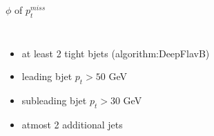 \documentclass[10pt,xcolor=dvipsnames]{beamer}
\begin{document}
\begin{frame}[fragile]{$\phi $ of $p^{miss}_t$ }
\begin{columns}
\begin{itemize}
      \item {at least 2 tight bjets (algorithm:DeepFlavB)}
      \item {leading bjet $p_t > 50 $ GeV}
      \item {subleading bjet $p_t > 30 $ GeV}
      \item {atmost 2 additional jets}
    \end{itemize}
  \end{columns}
\end{frame}

\end{document}
